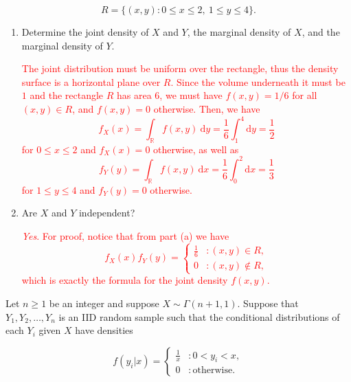 \documentclass[12pt,reqno]{amsart}
\begin{document}
	\[
	R=\{(x,y) : 0\leq x \leq 2, \ 1\leq y\leq 4\}.
	\]

\medskip
\begin{enumerate}
\item Determine the joint density of $X$ and $Y$, the marginal density of $X$, and the marginal density of $Y$.

\bigskip
\textcolor{red}{The joint distribution must be uniform over the rectangle, thus the density surface is a horizontal plane over $R$. Since the volume underneath it must be $1$ and the rectangle $R$ has area $6$, we must have $f(x,y) = 1/6$ for all $(x,y)\in R$, and $f(x,y) =0$ otherwise. Then, we have
	\[
	f_X(x) = \int_{\mathbb{R}} f(x,y) \ \text{d} y = \frac{1}{6} \int_1^4 \text{d} y = \frac{1}{2}
	\]
for $0 \leq x \leq 2$ and $f_X(x) =0$ otherwise, as well as
	\[
	f_Y(y) = \int_{\mathbb{R}} f(x,y) \ \text{d} x = \frac{1}{6} \int_0^2 \text{d} x = \frac{1}{3}
	\]
for $1 \leq y \leq 4$ and $f_Y(y)=0$ otherwise.}
\bigskip

\item Are $X$ and $Y$ independent?

\bigskip
\textcolor{red}{\textit{Yes}. For proof, notice that from part (a) we have
	\[
	f_X(x) f_Y(y) = \begin{cases}
	\frac{1}{6} & : (x,y) \in R, \\
	0 & : (x,y) \notin R,
	\end{cases}
	\]
which is exactly the formula for the joint density $f(x,y)$.}
\end{enumerate}
\bigskip











\prob Let $n\geq 1$ be an integer and suppose $X\sim \Gamma(n+1,1)$. Suppose that $Y_1,Y_2,\ldots,Y_n$ is an IID random sample such that the conditional distributions of each $Y_i$ given $X$ have densities

	\[
	f(y_i|x) = \begin{cases}
	\frac{1}{x} & : 0 < y_i < x, \\
	0 & : \text{otherwise}.
	\end{cases}
	\]
	
\end{document}
